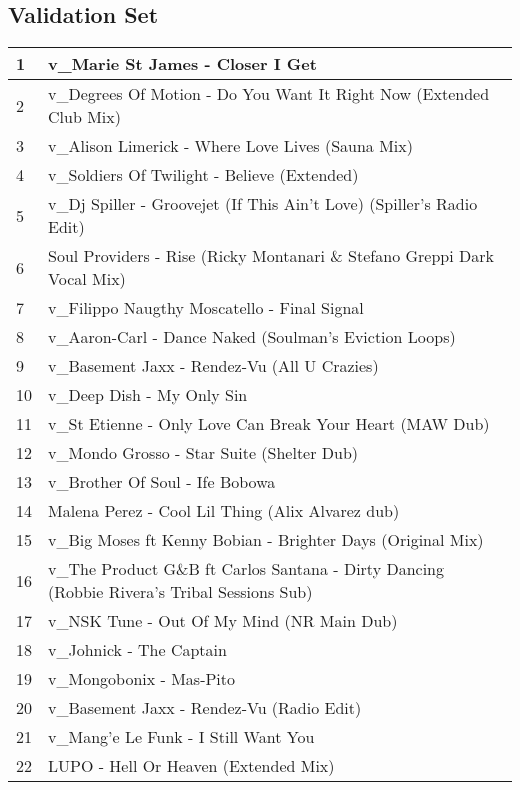 \begin{appendices}
\section{Validation Set}
\label{validationset}
\begin{longtable}{| p{} | p{} |}
\hline 
1 & v{\_}Marie St James - Closer I Get \\
\hline
2 & v{\_}Degrees Of Motion - Do You Want It Right Now (Extended Club Mix) \\
\hline
3 & v{\_}Alison Limerick - Where Love Lives (Sauna Mix) \\
\hline
4 & v{\_}Soldiers Of Twilight - Believe (Extended) \\
\hline
5 & v{\_}Dj Spiller - Groovejet (If This Ain't Love) (Spiller's Radio Edit) \\
\hline
6 & Soul Providers - Rise (Ricky Montanari {\&} Stefano Greppi Dark Vocal Mix) \\
\hline
7 & v{\_}Filippo Naugthy Moscatello - Final Signal \\
\hline
8 & v{\_}Aaron-Carl - Dance Naked (Soulman's Eviction Loops) \\
\hline
9 & v{\_}Basement Jaxx - Rendez-Vu (All U Crazies) \\
\hline
10 & v{\_}Deep Dish - My Only Sin \\
\hline
11 & v{\_}St Etienne - Only Love Can Break Your Heart (MAW Dub) \\
\hline
12 & v{\_}Mondo Grosso - Star Suite (Shelter Dub) \\
\hline
13 & v{\_}Brother Of Soul - Ife Bobowa \\
\hline
14 & Malena Perez - Cool Lil Thing (Alix Alvarez dub)\\
\hline
15 & v{\_}Big Moses ft Kenny Bobian - Brighter Days (Original Mix)\\
\hline
16 & v{\_}The Product G{\&}B ft Carlos Santana - Dirty Dancing (Robbie Rivera's Tribal Sessions Sub)\\
\hline
17 & v{\_}NSK Tune - Out Of My Mind (NR Main Dub)\\
\hline
18 & v{\_}Johnick - The Captain\\
\hline
19 & v{\_}Mongobonix - Mas-Pito \\
\hline
20 & v{\_}Basement Jaxx - Rendez-Vu (Radio Edit)\\
\hline
21 & v{\_}Mang'e Le Funk - I Still Want You\\
\hline
22 & LUPO - Hell Or Heaven (Extended Mix)\\
\hline

\end{longtable}
\end{appendices}
